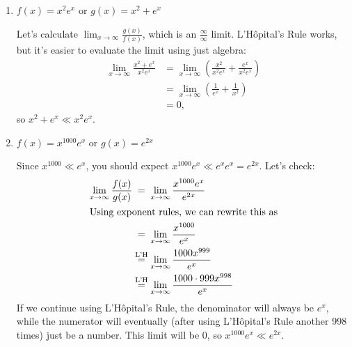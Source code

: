 \documentclass{article}
\begin{document}
\begin{enumerate}
\begin{enumerate}

  \item
    \begin{problem}[\vfill]
      $\displaystyle f(x) = x^2e^x$ or $\displaystyle g(x) = x^2+e^x$
    \end{problem}

    \begin{solution}
      Let's calculate $\displaystyle \lim_{x \to \infty}
      \frac{g(x)}{f(x)}$, which is an $\frac{\infty}{\infty}$ limit.
      L'H\^opital's Rule works, but it's easier to evaluate the limit
      using just algebra:
      \begin{align*}
        \lim_{x \to \infty} \frac{x^2 + e^x}{x^2 e^x} & = \lim_{x \to
          \infty} \left( \frac{x^2}{x^2 e^x} + \frac{e^x}{x^2 e^x} \right)
        \\
        &= \lim_{x \to \infty} \left( \frac{1}{e^x} + \frac{1}{x^2}
        \right) \\
        &= 0,
      \end{align*}
      so $\boxed{x^2 + e^x \ll x^2 e^x}$.       
    \end{solution}

  \item %

    \begin{problem}[\vfill\newpage]
      $\displaystyle f(x) = x^{1000} e^x$ or $g(x) = e^{2 x}$
    \end{problem}

    \begin{solution}
      Since $x^{1000} \ll e^x$, you should expect $x^{1000} e^x \ll e^x
      e^x = e^{2x}$.  Let's check:
      \begin{align*}
        \lim_{x \to \infty} \frac{f(x)}{g(x)} & \nolheq \lim_{x \to
          \infty}
        \frac{x^{1000} e^x}{e^{2x}} \\
        \shortintertext{Using exponent rules, we can rewrite this as} %
        & \nolheq \lim_{x \to \infty} \frac{x^{1000}}{e^{x}} \\
        & \lheq \lim_{x \to \infty} \frac{1000 x^{999}}{e^{x}} \\
        & \lheq \lim_{x \to \infty} \frac{1000 \cdot 999 x^{998}}{e^{x}}
      \end{align*}
      If we continue using L'H\^opital's Rule, the denominator will always
      be $e^{x}$, while the numerator will eventually
      (after using L'H\^opital's Rule another 998 times) just be a number.
      This limit will be 0, so $\boxed{x^{1000} e^x \ll e^{2x}}$.
    \end{solution}


\end{enumerate}
\end{enumerate}
\end{document}

